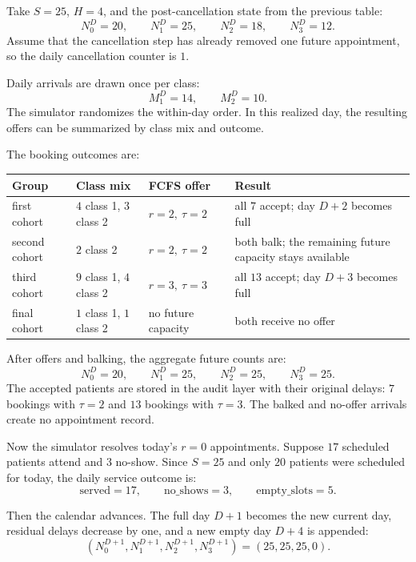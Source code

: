 \documentclass[11pt]{article}
\begin{document}
\begin{examplebox}[title={Worked Example: One Full Day \(D\)}]
Take \(S=25\), \(H=4\), and the post-cancellation state from the previous table:
\[
N_0^D=20,\qquad N_1^D=25,\qquad N_2^D=18,\qquad N_3^D=12.
\]
Assume that the cancellation step has already removed one future appointment, so the daily cancellation
counter is \(1\).

Daily arrivals are drawn once per class:
\[
M_1^D=14,\qquad M_2^D=10.
\]
The simulator randomizes the within-day order. In this realized day, the resulting offers can be
summarized by class mix and outcome.

The booking outcomes are:
\begin{center}
\small
\begin{tabular}{L{0.18\textwidth} L{0.20\textwidth} L{0.18\textwidth} L{0.30\textwidth}}
\toprule
\textbf{Group} & \textbf{Class mix} & \textbf{FCFS offer} & \textbf{Result} \\
\midrule
first cohort & \(4\) class 1, \(3\) class 2 & \(r=2,\ \tau=2\) & all \(7\) accept; day \(D+2\) becomes full \\
\addlinespace
second cohort & \(2\) class 2 & \(r=2,\ \tau=2\) & both balk; the remaining future capacity stays available \\
\addlinespace
third cohort & \(9\) class 1, \(4\) class 2 & \(r=3,\ \tau=3\) & all \(13\) accept; day \(D+3\) becomes full \\
\addlinespace
final cohort & \(1\) class 1, \(1\) class 2 & no future capacity & both receive no offer \\
\bottomrule
\end{tabular}
\normalsize
\end{center}

After offers and balking, the aggregate future counts are:
\[
N_0^D=20,\qquad N_1^D=25,\qquad N_2^D=25,\qquad N_3^D=25.
\]
The accepted patients are stored in the audit layer with their original delays: \(7\) bookings with
\(\tau=2\) and \(13\) bookings with \(\tau=3\). The balked and no-offer arrivals create no
appointment record.

Now the simulator resolves today's \(r=0\) appointments. Suppose \(17\) scheduled patients attend
and \(3\) no-show. Since \(S=25\) and only \(20\) patients were scheduled for today, the daily service
outcome is:
\[
\mathrm{served}=17,\qquad
\mathrm{no\_shows}=3,\qquad
\mathrm{empty\_slots}=5.
\]

Then the calendar advances. The full day \(D+1\) becomes the new current day, residual delays
decrease by one, and a new empty day \(D+4\) is appended:
\[
\left(N_0^{D+1},N_1^{D+1},N_2^{D+1},N_3^{D+1}\right)
=
(25,25,25,0).
\]
\end{examplebox}
\end{document}
